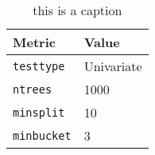 \begin{table}[H]
    \centering
    \begin{tabular}{|p{3cm}|p{3cm}|}
        \hline
        \textbf{Metric} & \textbf{Value} \\
        \hline
        \hline
        \texttt{testtype} & Univariate \\
        \hline
        \texttt{ntrees} & 1000 \\
        \hline
        \texttt{minsplit} & 10 \\
        \hline
        \texttt{minbucket} & 3 \\
        \hline
    \end{tabular}
    \caption{this is a caption}
    \label{tab:cforest_best_metrics}
\end{table}
